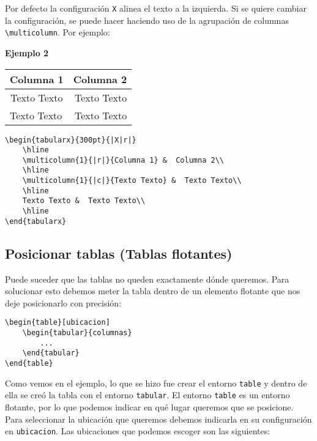	Por defecto la configuración \verb|X| alinea el texto a la izquierda. Si se quiere cambiar la configuración, se puede hacer haciendo uso de la agrupación de columnas \verb|\multicolumn|. Por ejemplo:
	
	\textbf{Ejemplo 2}
	
	\begin{center}
		\begin{tabularx}{300pt}{|X|r|}		
			\hline
			\multicolumn{1}{|r|}{Columna 1} &  Columna 2\\ 
			\hline
			\multicolumn{1}{|c|}{Texto Texto} &  Texto Texto\\ 
			\hline	
			Texto Texto &  Texto Texto\\ 
			\hline	
		\end{tabularx}	
	\end{center}	
	
	
	\begin{myquote}
		\begin{lstlisting}
\begin{tabularx}{300pt}{|X|r|}		
	\hline
	\multicolumn{1}{|r|}{Columna 1} &  Columna 2\\ 
	\hline
	\multicolumn{1}{|c|}{Texto Texto} &  Texto Texto\\ 
	\hline	
	Texto Texto &  Texto Texto\\ 
	\hline	
\end{tabularx}			
		\end{lstlisting}		
	\end{myquote}
	
	
	\subsection{Posicionar tablas (Tablas flotantes)}
	
	Puede suceder que las tablas no queden exactamente dónde queremos. Para solucionar esto debemos meter la tabla dentro de un elemento flotante que nos deje posicionarlo con precisión:
	
	\begin{myquote}
		\begin{lstlisting}
\begin{table}[ubicacion]
	\begin{tabular}{columnas}
		...
	\end{tabular}
\end{table}			
		\end{lstlisting}		
	\end{myquote}
	
	
	Como vemos en el ejemplo, lo que se hizo fue crear el entorno \verb|table| y dentro de ella se creó la tabla con el entorno \verb|tabular|. El entorno \verb|table| es un entorno flotante, por lo que podemos indicar en qué lugar queremos que se posicione. Para seleccionar la ubicación que queremos debemos indicarla en su configuración en \verb|ubicacion|. Las ubicaciones que podemos escoger son las siguientes:
	
